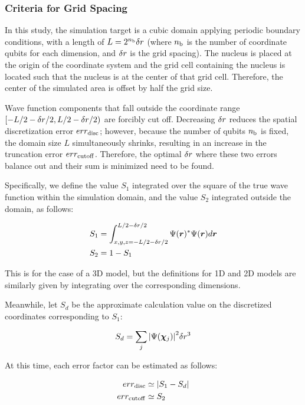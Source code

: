\documentclass[aip-draft.tex]{subfiles}
\begin{document}
\subsubsection{Criteria for Grid Spacing}
\label{subsec:criteria-for-grid-spacing}

In this study, the simulation target is a cubic domain applying periodic
boundary conditions, with a length of $L=2^{n_{\mathrm{b}}}\delta r$ (where $n_{\mathrm{b}}$ is the
number of coordinate qubits for each dimension, and $\delta r$ is the grid
spacing). The nucleus is placed at the origin of the coordinate system and the
grid cell containing the nucleus is located such that the nucleus is at the
center of that grid cell. Therefore, the center of the simulated area is offset
by half the grid size.

Wave function components that fall outside the coordinate range
$[-L/2-\delta r/2, L/2-\delta r/2)$ are forcibly cut off. Decreasing $\delta r$
reduces the spatial discretization error $err_{\mathrm{disc}}$; however, because the number
of qubits $n_{\mathrm{b}}$ is fixed, the domain size $L$ simultaneously shrinks, resulting
in an increase in the truncation error $err_{\mathrm{cutoff}}$. Therefore, the optimal
$\delta r$ where these two errors balance out and their sum is minimized need to
be found.

Specifically, we define the value $S_1$ integrated over the square of the true
wave function within the simulation domain, and the value $S_2$ integrated
outside the domain, as follows:

\begin{align}
S_1 &= \int_{x,y,z=-L/2-\delta r/2}^{L/2-\delta r/2}\Psi(\bm{r})^{\ast}\Psi(\bm{r}) d\bm{r} \\
S_2 &= 1 - S_1
\end{align}

This is for the case of a 3D model, but the definitions for 1D and 2D models are
similarly given by integrating over the corresponding dimensions.

Meanwhile, let $S_d$ be the approximate calculation value on the discretized
coordinates corresponding to $S_1$:

\begin{equation}
S_d = \sum_{j}{\left| \Psi(\bm{\chi}_{j}) \right|}^2 \delta r^3
\end{equation}

At this time, each error factor can be estimated as follows:

\begin{align}
err_{\mathrm{disc}} &\simeq {\left| S_1 - S_d \right|} \label{eq:err-disc-definition}\\
err_{\mathrm{cutoff}} &\simeq S_2 \label{eq:err-cutoff-definition}
\end{align}
\end{document}
